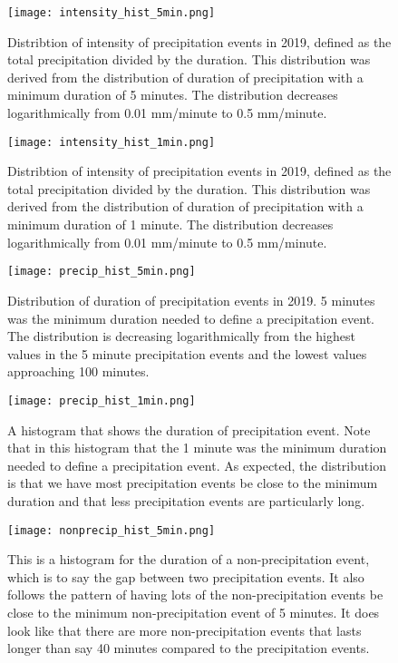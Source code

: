 \documentclass[12pt]{article}
\begin{document}
	\vfill
	\begin{figure}[h]
		\centering
		\texttt{[image: intensity\_hist\_5min.png]}
		\caption{Distribtion of intensity of precipitation events in 2019, defined as the total precipitation divided by the duration. This distribution was derived from the distribution of duration of precipitation with a minimum duration of 5 minutes. The distribution decreases logarithmically from 0.01 mm/minute to 0.5 mm/minute.}
	\end{figure}
\vfill
	\begin{figure}[h]
	\centering
	\texttt{[image: intensity\_hist\_1min.png]}
	\caption{Distribtion of intensity of precipitation events in 2019, defined as the total precipitation divided by the duration. This distribution was derived from the distribution of duration of precipitation with a minimum duration of 1 minute. The distribution decreases logarithmically from 0.01 mm/minute to 0.5 mm/minute.}
\end{figure}
\vfill
\begin{figure}[h]
	\centering
	\texttt{[image: precip\_hist\_5min.png]}
	\caption{Distribution of duration of precipitation events in 2019. 5 minutes was the minimum duration needed to define a precipitation event. The distribution is decreasing logarithmically from the highest values in the 5 minute precipitation events and the lowest values approaching 100 minutes.}
\end{figure}
\begin{figure}[h]
	\centering
	\texttt{[image: precip\_hist\_1min.png]}
	\caption{A histogram that shows the duration of precipitation event. Note that in this histogram that the 1 minute was the minimum duration needed to define a precipitation event. As expected, the distribution is that we have most precipitation events be close to the minimum duration and that less precipitation events are particularly long. }
\end{figure}
\begin{figure}[h]
	\centering
	\texttt{[image: nonprecip\_hist\_5min.png]}
	\caption{This is a histogram for the duration of a non-precipitation event, which is to say the gap between two precipitation events. It also follows the pattern of having lots of the non-precipitation events be close to the minimum non-precipitation event of 5 minutes. It does look like that there are more non-precipitation events that lasts longer than say 40 minutes compared to the precipitation events. }
\end{figure}
\end{document}
